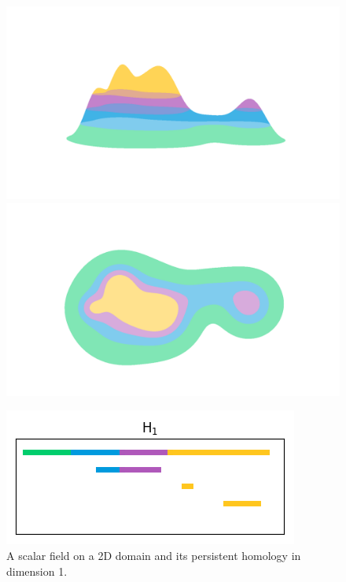 \begin{figure}[htbp]
  \begin{minipage}{0.35\textwidth}
    \centering
    \includegraphics[trim=200 200 200 200, clip, width=0.8\linewidth]{figures/surf-side.png}
    \includegraphics[trim=200 100 200 150, clip, width=0.75\linewidth]{figures/surf-top.png}
  \end{minipage}
  \begin{minipage}{0.5\textwidth}
    \centering
    \includegraphics[width=\linewidth]{figures/scalar_barcode_H1.png}
  \end{minipage}
  \caption{A scalar field on a 2D domain and its persistent homology in dimension 1.}
\end{figure}


